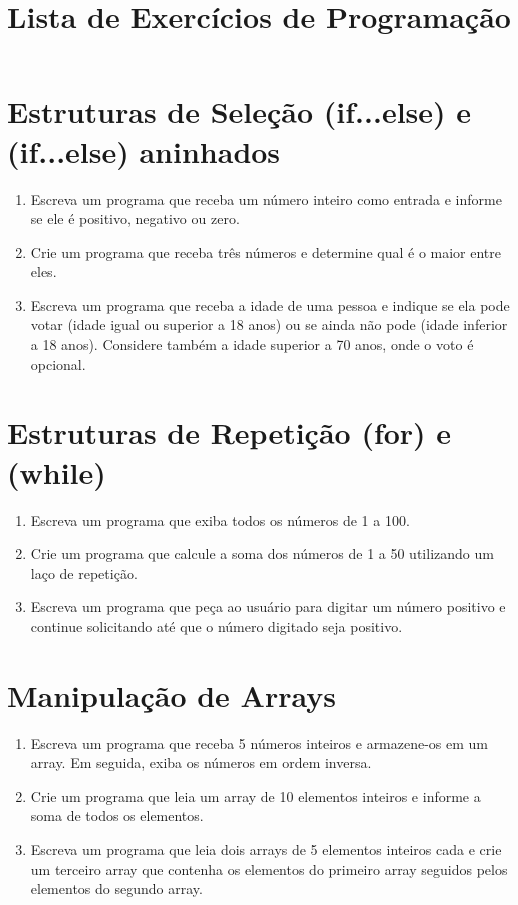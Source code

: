 \documentclass[a4paper, 12pt]{article}
\title{Lista de Exercícios de Programação}
\author{}
\date{}
\begin{document}
\maketitle

\vspace{-2cm}

\section*{Estruturas de Seleção (if...else) e (if...else) aninhados}

\begin{enumerate}
    \item Escreva um programa que receba um número inteiro como entrada e informe se ele é positivo, negativo ou zero.
    \item Crie um programa que receba três números e determine qual é o maior entre eles.
    \item Escreva um programa que receba a idade de uma pessoa e indique se ela pode votar (idade igual ou superior a 18 anos) ou se ainda não pode (idade inferior a 18 anos). Considere também a idade superior a 70 anos, onde o voto é opcional.
\end{enumerate}

\section*{Estruturas de Repetição (for) e (while)}

\begin{enumerate}
    \item Escreva um programa que exiba todos os números de 1 a 100.
    \item Crie um programa que calcule a soma dos números de 1 a 50 utilizando um laço de repetição.
    \item Escreva um programa que peça ao usuário para digitar um número positivo e continue solicitando até que o número digitado seja positivo.
\end{enumerate}

\section*{Manipulação de Arrays}

\begin{enumerate}
    \item Escreva um programa que receba 5 números inteiros e armazene-os em um array. Em seguida, exiba os números em ordem inversa.
    \item Crie um programa que leia um array de 10 elementos inteiros e informe a soma de todos os elementos.
    \item Escreva um programa que leia dois arrays de 5 elementos inteiros cada e crie um terceiro array que contenha os elementos do primeiro array seguidos pelos elementos do segundo array.
\end{enumerate}
\end{document}
